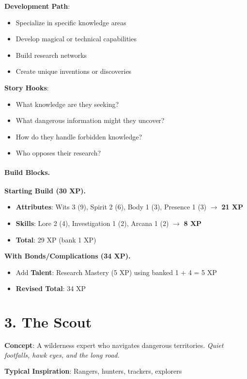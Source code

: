 \textbf{Development Path}:
\begin{itemize}
\item Specialize in specific knowledge areas
\item Develop magical or technical capabilities
\item Build research networks
\item Create unique inventions or discoveries
\end{itemize}

\textbf{Story Hooks}:
\begin{itemize}
\item What knowledge are they seeking?
\item What dangerous information might they uncover?
\item How do they handle forbidden knowledge?
\item Who opposes their research?
\end{itemize}

\paragraph{Build Blocks.}
\textbf{Starting Build (30 XP).}
\begin{itemize}
\item \textbf{Attributes}: Wits 3 (9), Spirit 2 (6), Body 1 (3), Presence 1 (3) $\rightarrow$ \textbf{21 XP}
\item \textbf{Skills}: Lore 2 (4), Investigation 1 (2), Arcana 1 (2) $\rightarrow$ \textbf{8 XP}
\item \textbf{Total}: 29 XP (bank 1 XP)
\end{itemize}
\textbf{With Bonds/Complications (34 XP).}
\begin{itemize}
\item Add \textbf{Talent}: Research Mastery (5 XP) using banked 1 + 4 = 5 XP
\item \textbf{Revised Total}: 34 XP
\end{itemize}

\section{3. The Scout}

\textbf{Concept}: A wilderness expert who navigates dangerous territories. \emph{Quiet footfalls, hawk eyes, and the long road.}

\textbf{Typical Inspiration}: Rangers, hunters, trackers, explorers

